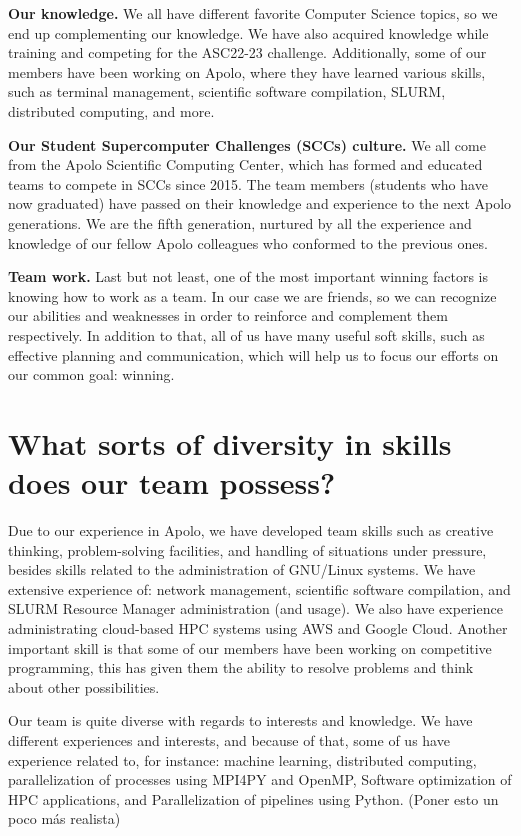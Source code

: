 \documentclass[11pt,a4paper,twocolumn]{article}
\begin{document}
\textbf{Our knowledge.} We all have different favorite Computer Science topics, so we end up complementing our knowledge. We have also acquired knowledge while training and competing for the ASC22-23 challenge. Additionally, some of our members have been working on Apolo, where they have learned various skills, such as terminal management, scientific software compilation, SLURM, distributed computing, and more.

\textbf{Our Student Supercomputer Challenges (SCCs) culture.} We all come from the Apolo Scientific Computing Center, which has formed and educated teams to compete in SCCs since 2015. The team members (students who have now graduated) have passed on their knowledge and experience to the next Apolo generations. We are the fifth generation, nurtured by all the experience and knowledge of our fellow Apolo colleagues who conformed to the previous ones.

\textbf{Team work.} Last but not least, one of the most important winning factors is knowing how to work as a team. In our case we are friends, so we can recognize our abilities and weaknesses in order to reinforce and complement them respectively. In addition to that, all of us have many useful soft skills, such as effective planning and communication, which will help us to focus our efforts on our common goal: winning.

\section{What sorts of diversity in skills does our team possess?}

Due to our experience in Apolo, we have developed team skills such as creative thinking, problem-solving facilities, and handling of situations under pressure, besides skills related to the administration of GNU/Linux systems. We have extensive experience of: network management, scientific software compilation, and SLURM Resource Manager administration (and usage). We also have experience administrating cloud-based HPC systems using AWS and Google Cloud. Another important skill is that some of our members have been working on competitive programming, this has given them the ability to resolve problems and think about other possibilities.

Our team is quite diverse with regards to interests and knowledge. We have different experiences and interests, and because of that, some of us have experience related to, for instance: machine learning, distributed computing, parallelization of processes using MPI4PY and OpenMP, Software optimization of HPC applications, and Parallelization of pipelines using Python. (Poner esto un poco más realista)
\end{document}
